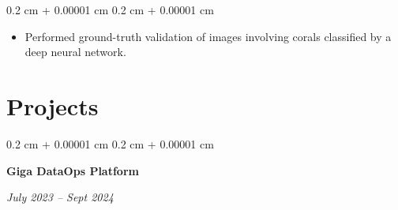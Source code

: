 \documentclass[10pt, a4paper]{article}
\newenvironment{highlights}{
    \begin{itemize}[
        topsep=0.10 cm,
        parsep=0.10 cm,
        partopsep=0pt,
        itemsep=0pt,
        leftmargin=0.4 cm + 10pt
    ]
}{
    \end{itemize}
} %
\newenvironment{onecolentry}{
    \begin{adjustwidth}{
        0.2 cm + 0.00001 cm
    }{
        0.2 cm + 0.00001 cm
    }
}{
    \end{adjustwidth}
} %
\newenvironment{twocolentry}[2][]{
    \onecolentry
    \def\secondColumn{#2}
    \setcolumnwidth{\fill, 4.5 cm}
    \begin{paracol}{2}
}{
    \switchcolumn \raggedleft \secondColumn
    \end{paracol}
    \endonecolentry
} %
\begin{document}
        \vspace{0.10 cm}
        \begin{onecolentry}
            \begin{highlights}
                \item Performed ground-truth validation of images involving corals classified by a deep neural network.
            \end{highlights}
        \end{onecolentry}



    
    \section{Projects}



        
        \begin{twocolentry}{
            
            
        \textit{July 2023 – Sept 2024}}
            \textbf{Giga DataOps Platform}
        \end{twocolentry}
\end{document}
